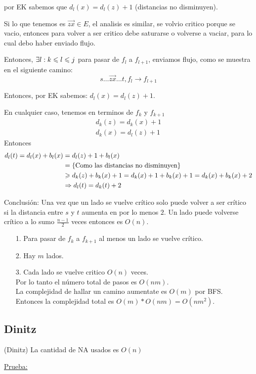 \documentclass[12pt,a4paper]{article}
\begin{document}
por EK sabemos que $d_{l}(x) = d_{l}(z) + 1$ (distancias no disminuyen).
\medskip

Si lo que tenemos es $\overrightarrow{zx} \in E$, el analisis es similar, se volvio 
critico porque se vacio, entonces para volver a ser critico debe saturarse o volverse 
a vaciar, para lo cual debo haber enviado flujo.
\medskip

Entonces, $\exists l: k \leqslant l \leqslant j$ para pasar de $f_{l}$ a $f_{l+1}$, enviamos flujo, 
como se muestra en el siguiente camino:
$$s\ldots \overrightarrow{zx} \ldots t, f_{l} \to f_{l+1}$$

Entonces, por EK sabemos: $d_{l}(x) = d_{l}(z) + 1$.
\medskip

En cualquier caso, tenemos en terminos de $f_{k}$ y $f_{k+1}$
\begin{align*}
    d_{k}(z) = d_{k}(x) +1\\
    d_{k}(x) = d_{l}(z) +1
\end{align*}
Entonces
\begin{align*}
    d_{l}(t) = d_{l}(x) + b_{l}(x) &= d_{l}(z) + 1 + b_{l}(x)\\
    &=\left\lbrace \text{Como las distancias no disminuyen} \right\rbrace\\
    &\geqslant d_{k}(z) + b_{k}(x) + 1 = d_{k}(x) + 1 + b_{k}(x) +1 = d_{k}(x) + b_{k}(x)+2\\
    &\Rightarrow d_{l}(t) = d_{k}(t) +2
\end{align*}

Conclusión: Una vez que un lado se vuelve crítico solo puede volver a ser crítico 
si la distancia entre $s$ y $t$ aumenta en por lo menos $2$. Un lado puede volverse 
crítico a lo sumo $\frac{n-1}{2}$ veces entonces es $O(n)$.
\medskip

\begin{itemize}
    \item [1.] Para pasar de $f_{k}$ a $f_{k+1}$ al menos un lado se vuelve crítico.
    \item [2.] Hay $m$ lados.
    \item [3.] Cada lado se vuelve critico $O(n)$ veces.\\
        Por lo tanto el número total de pasos es $O(nm)$.\\
        La complejidad de hallar un camino aumentate es $O(m)$ por BFS.\\
        Entonces la complejidad total es $O(m)*O(nm)=O(nm^{2})$.
\end{itemize}

\subsection{Dinitz}
\begin{teorema} (Dinitz) La cantidad de NA usados es $O(n)$
\end{teorema}
\underline{Prueba:}
\medskip
\end{document}
